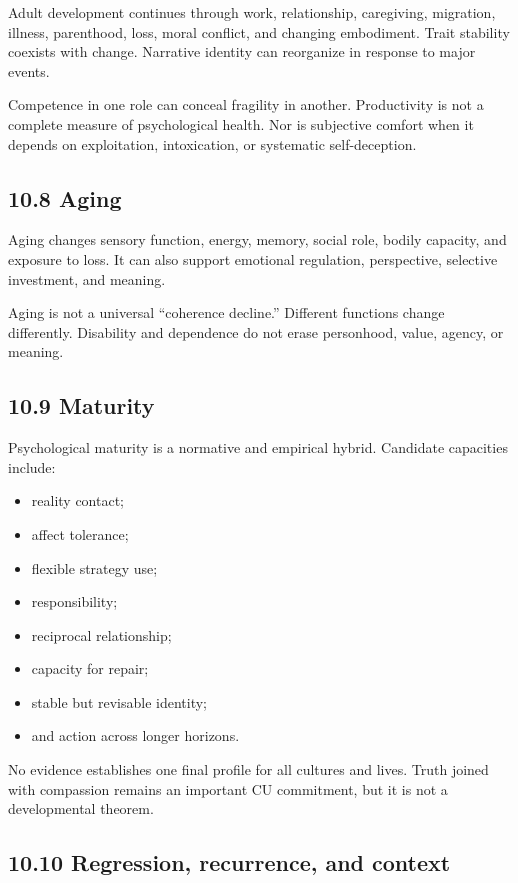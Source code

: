 \documentclass[
  11pt,
]{article}
\providecommand{\tightlist}{%
  \setlength{\itemsep}{0pt}\setlength{\parskip}{0pt}}
\begin{document}
Adult development continues through work, relationship, caregiving,
migration, illness, parenthood, loss, moral conflict, and changing
embodiment. Trait stability coexists with change. Narrative identity can
reorganize in response to major events.

Competence in one role can conceal fragility in another. Productivity is
not a complete measure of psychological health. Nor is subjective
comfort when it depends on exploitation, intoxication, or systematic
self-deception.

\subsection{10.8 Aging}\label{aging}

Aging changes sensory function, energy, memory, social role, bodily
capacity, and exposure to loss. It can also support emotional
regulation, perspective, selective investment, and meaning.

Aging is not a universal ``coherence decline.'' Different functions
change differently. Disability and dependence do not erase personhood,
value, agency, or meaning.

\subsection{10.9 Maturity}\label{maturity}

Psychological maturity is a normative and empirical hybrid. Candidate
capacities include:

\begin{itemize}
\tightlist
\item
  reality contact;
\item
  affect tolerance;
\item
  flexible strategy use;
\item
  responsibility;
\item
  reciprocal relationship;
\item
  capacity for repair;
\item
  stable but revisable identity;
\item
  and action across longer horizons.
\end{itemize}

No evidence establishes one final profile for all cultures and lives.
Truth joined with compassion remains an important CU commitment, but it
is not a developmental theorem.

\subsection{10.10 Regression, recurrence, and
context}\label{regression-recurrence-and-context}
\end{document}
